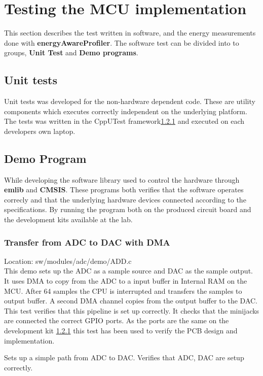 \section{Testing the MCU implementation}

This section describes the test written in software, and the energy measurements 
done with {\bf energyAwareProfiler}. The software test can be divided into to 
groups, {\bf Unit Test} and {\bf Demo programs}. 

\subsection{Unit tests}

Unit tests was developed for the non-hardware dependent code. These are utility components
which executes correctly independent on the underlying platform. The tests was written in 
the CppUTest framework\ref{} and executed on each developers own laptop. 

\subsection{Demo Program}

While developing the software library used to control the hardware through {\bf emlib} and
{\bf CMSIS}. These programs both verifies that the software operates correcly and that 
the underlying hardware devices connected according to the specifications. By running the
program both on the produced circuit board and the development kits available at the lab.

\subsubsection{Transfer from ADC to DAC with DMA}
Location: sw/modules/adc/demo/ADD.c \\
This demo sets up the ADC as a sample source and DAC as the sample output. It uses DMA
to copy from the ADC to a input buffer in Internal RAM on the MCU. After 64 samples 
the CPU is interrupted and transfers the samples to output buffer. A second DMA channel 
copies from the output buffer to the DAC. This test verifies that this pipeline is set
up correctly. It checks that the minijacks are connected the correct GPIO ports. As
the ports are the same on the development kit \ref{} this test has been used to verify
the PCB design and implementation. 

Sets up a simple path from ADC to DAC.
Verifies that ADC, DAC are setup correctly.

